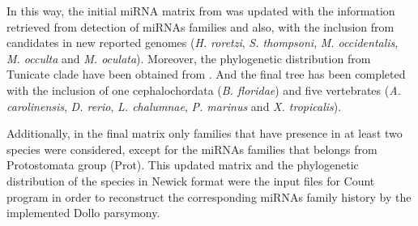 \documentclass[11pt]{article}
\begin{document}
In this way, the initial miRNA matrix from \cite{Hertel2015} was updated 
with the information retrieved from detection of miRNAs families and also, with 
the inclusion from candidates in new reported genomes (\textit{H. roretzi}, 
\textit{S. thompsoni}, \textit{M. occidentalis}, \textit{M. occulta} and 
\textit{M. oculata}). Moreover, the phylogenetic distribution from Tunicate 
clade have been obtained from \cite{Simion2016}. And the final tree has been 
completed with the inclusion of one cephalochordata (\textit{B. floridae}) and 
five vertebrates (\textit{A. carolinensis}, \textit{D. rerio}, \textit{L. 
chalumnae}, \textit{P. marinus} and \textit{X. tropicalis}).

Additionally, in the final matrix only families that have presence in at least 
two species were considered, except for the miRNAs families that belongs from 
Protostomata group (Prot). This updated matrix and the phylogenetic 
distribution of the species in Newick format were the input files for Count 
program \cite{Csuos2010} in order to reconstruct the corresponding miRNAs family 
history by the implemented Dollo parsymony.
\end{document}
